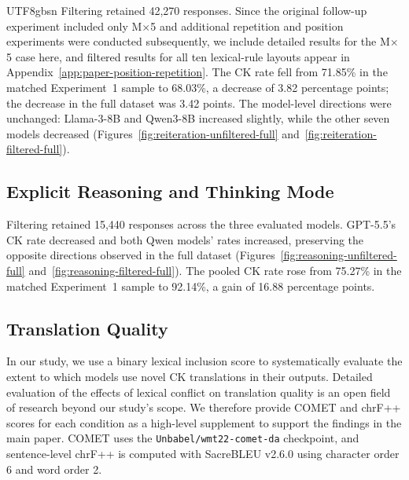 \documentclass[11pt]{article}
\begin{document}
\begin{CJK*}{UTF8}{gbsn}
Filtering retained 42,270 responses. Since the original follow-up experiment included only M$\times$5 and additional repetition and position experiments were conducted subsequently, we include detailed results for the M$\times$5 case here, and filtered results for all ten lexical-rule layouts appear in Appendix~\ref{app:paper-position-repetition}. The CK rate fell from 71.85\% in the matched Experiment~1 sample to 68.03\%, a decrease of 3.82 percentage points; the decrease in the full dataset was 3.42 points. The model-level directions were unchanged: Llama-3-8B and Qwen3-8B increased slightly, while the other seven models decreased (Figures~\ref{fig:reiteration-unfiltered-full} and~\ref{fig:reiteration-filtered-full}). 

\subsection{Explicit Reasoning and Thinking Mode}
\label{app:reasoning-full-results}

Filtering retained 15,440 responses across the three evaluated models. GPT-5.5's CK rate decreased and both Qwen models' rates increased, preserving the opposite directions observed in the full dataset (Figures~\ref{fig:reasoning-unfiltered-full} and~\ref{fig:reasoning-filtered-full}). The pooled CK rate rose from 75.27\% in the matched Experiment~1 sample to 92.14\%, a gain of 16.88 percentage points.



\subsection{Translation Quality}
\label{app:translation-quality}


In our study, we use a binary lexical inclusion score to systematically evaluate the extent to which models use novel CK translations in their outputs. Detailed evaluation of the effects of lexical conflict on translation quality is an open field of research beyond our study's scope. We therefore provide COMET \citep{rei-etal-2020-comet} and chrF++ \citep{popovic-2017-chrf} scores for each condition as a high-level supplement to support the findings in the main paper. COMET uses the \texttt{Unbabel/wmt22-comet-da} checkpoint, and sentence-level chrF++ is computed with SacreBLEU v2.6.0 using character order 6 and word order 2.


\end{CJK*}
\end{document}
